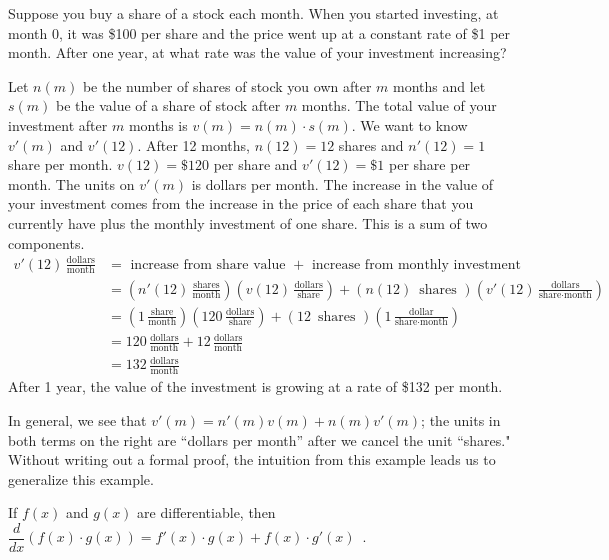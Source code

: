 \begin{example} Suppose you buy a share of a stock each month. When you started investing, at month 0, it was \$100 per share and the price went up at a constant rate of \$1 per month. After one year, at what rate was the value of your investment increasing?

\begin{solution} Let $n(m)$ be the number of shares of stock you own after $m$ months and let $s(m)$ be the value of a share of stock after $m$ months. The total value of your investment after $m$ months is $v(m) = n(m)\cdot s(m)$. We want to know $v'(m)$ and $v'(12)$. After 12 months, $n(12) = 12$ shares and $n'(12) = 1$ share per month. $v(12) = \$120$ per share and $v'(12) = \$1$ per share per month. The units on $v'(m)$ is dollars per month. The increase in the value of your investment comes from the increase in the price of each share that you currently have plus the monthly investment of one share. This is a sum of two components.
\begin{align*}
v'(12) \,\frac{\text{dollars}}{\text{month}} &=  \text{ increase from share value } + \text{ increase from monthly investment } \\
    &= \left( n'(12) \,\frac{\text{shares}}{\text{month}} \right) \left( v(12)\,\frac{\text{dollars}}{\text{share}} \right) + \left(  n(12)\, \text{ shares }\right)\left( v'(12)\, \frac{\text{dollars}}{\text{share}\cdot \text{month}} \right) \\
&= \left( 1 \,\frac{\text{share}}{\text{month}} \right) \left( 120 \,\frac{\text{dollars}}{\text{share}} \right) + \left(  12 \,\text{ shares }\right)\left( 1\, \frac{\text{dollar}}{\text{share}\cdot \text{month}} \right) \\
&= 120 \,\frac{\text{dollars}}{\text{month}}+ 12 \,\frac{\text{dollars}}{\text{month}}\\
&= 132 \,\frac{\text{dollars}}{\text{month}}
\end{align*}
After 1 year, the value of the investment is growing at a rate of \$132 per month. 
\end{solution}\end{example}

In general, we see that $v'(m) = n'(m)v(m) + n(m)v'(m)$; the units in both terms on the right are ``dollars per month'' after we cancel the unit ``shares." Without writing out a formal proof, the intuition from this example leads us to generalize this example. 

\begin{theorem}
If $f(x)$ and $g(x)$ are differentiable, then
$\dfrac{d}{dx}\left( f(x)\cdot g(x) \right)=f'(x)\cdot g(x)+f(x)\cdot g'(x) \enspace .$
\end{theorem}

